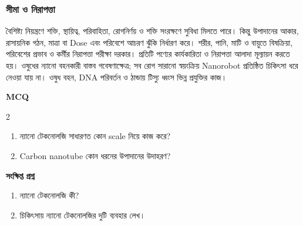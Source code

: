 \subsubsection{সীমা ও নিরাপত্তা}
বৈশিষ্ট্য নিয়ন্ত্রণে শক্তি, স্থায়িত্ব, পরিবাহিতা, রোগনির্ণয় ও শক্তি সংরক্ষণে সুবিধা মিলতে পারে। কিন্তু উপাদানের আকার, রাসায়নিক গঠন, মাত্রা বা Dose এবং পরিবেশে আচরণ ঝুঁকি নির্ধারণ করে। শরীর, পানি, মাটি ও বায়ুতে বিষক্রিয়া, পরিবেশের প্রভাব ও কর্মীর নিরাপত্তা পরীক্ষা দরকার। প্রতিটি পণ্যের কার্যকারিতা ও নিরাপত্তা আলাদা মূল্যায়ন করতে হয়।
ওষুধের ন্যানো বহনকারী বাস্তব গবেষণাক্ষেত্র; সব রোগ সারানো স্বয়ংক্রিয় Nanorobot প্রতিষ্ঠিত চিকিৎসা ধরে নেওয়া যায় না। ওষুধ বহন, DNA পরিবর্তন ও ঠান্ডায় টিস্যু ধ্বংস ভিন্ন প্রযুক্তির কাজ।
\begin{practicebox}
\textbf{MCQ}
\begin{multicols}{2}\begin{enumerate}
\item \begin{minipage}[t]{\linewidth}ন্যানো টেকনোলজি সাধারণত কোন scale নিয়ে কাজ করে?\par {}\par\end{minipage}
\item \begin{minipage}[t]{\linewidth}Carbon nanotube কোন ধরনের উপাদানের উদাহরণ?\par {}\par\end{minipage}
\end{enumerate}\end{multicols}

\textbf{সংক্ষিপ্ত প্রশ্ন}
\begin{enumerate}
\item ন্যানো টেকনোলজি কী?
\item চিকিৎসায় ন্যানো টেকনোলজির দুটি ব্যবহার লেখ।
\end{enumerate}
\end{practicebox}


